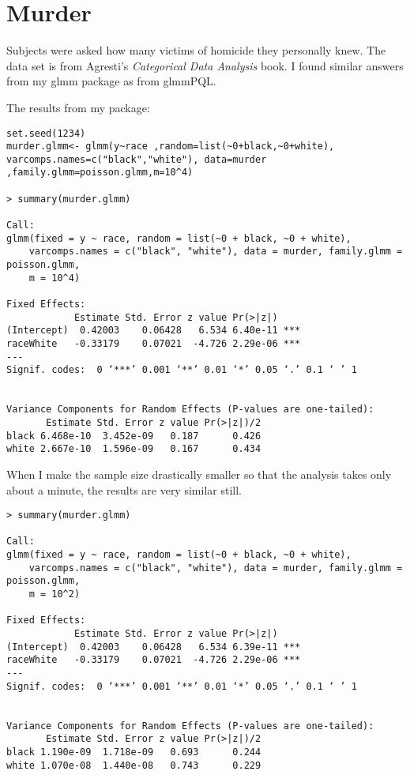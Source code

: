 \documentclass{article}
\begin{document}
\section{Murder}
Subjects were asked how many victims of homicide they personally knew. The data set is from Agresti's \textit{Categorical Data Analysis} book. I found similar answers from my glmm package as from glmmPQL.

The results from my package:

\begin{verbatim}
set.seed(1234)
murder.glmm<- glmm(y~race ,random=list(~0+black,~0+white), varcomps.names=c("black","white"), data=murder ,family.glmm=poisson.glmm,m=10^4)

> summary(murder.glmm)

Call:
glmm(fixed = y ~ race, random = list(~0 + black, ~0 + white), 
    varcomps.names = c("black", "white"), data = murder, family.glmm = poisson.glmm, 
    m = 10^4)

Fixed Effects:
            Estimate Std. Error z value Pr(>|z|)    
(Intercept)  0.42003    0.06428   6.534 6.40e-11 ***
raceWhite   -0.33179    0.07021  -4.726 2.29e-06 ***
---
Signif. codes:  0 ‘***’ 0.001 ‘**’ 0.01 ‘*’ 0.05 ‘.’ 0.1 ‘ ’ 1


Variance Components for Random Effects (P-values are one-tailed):
       Estimate Std. Error z value Pr(>|z|)/2
black 6.468e-10  3.452e-09   0.187      0.426
white 2.667e-10  1.596e-09   0.167      0.434
\end{verbatim}

When I make the sample size drastically smaller so that the analysis takes only about a minute, the results are very similar still.
\begin{verbatim}
> summary(murder.glmm)

Call:
glmm(fixed = y ~ race, random = list(~0 + black, ~0 + white), 
    varcomps.names = c("black", "white"), data = murder, family.glmm = poisson.glmm, 
    m = 10^2)

Fixed Effects:
            Estimate Std. Error z value Pr(>|z|)    
(Intercept)  0.42003    0.06428   6.534 6.39e-11 ***
raceWhite   -0.33179    0.07021  -4.726 2.29e-06 ***
---
Signif. codes:  0 ‘***’ 0.001 ‘**’ 0.01 ‘*’ 0.05 ‘.’ 0.1 ‘ ’ 1


Variance Components for Random Effects (P-values are one-tailed):
       Estimate Std. Error z value Pr(>|z|)/2
black 1.190e-09  1.718e-09   0.693      0.244
white 1.070e-08  1.440e-08   0.743      0.229

\end{verbatim}
\end{document}
